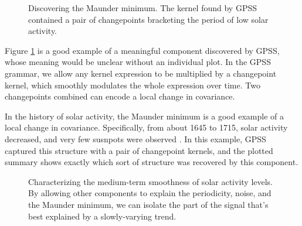 \documentclass{article} %
\begin{document}
\begin{figure}[h!]
\centering
{}
\caption{Discovering the Maunder minimum.  The kernel found by GPSS contained a pair of changepoints bracketing the period of low solar activity.}
\label{fig:maunder}
\end{figure}

Figure \ref{fig:maunder} is a good example of a meaningful component discovered by GPSS, whose meaning would be unclear without an individual plot.  In the GPSS grammar, we allow any kernel expression to be multiplied by a changepoint kernel, which smoothly modulates the whole expression over time.  Two changepoints combined can encode a local change in covariance.

In the history of solar activity, the Maunder minimum is a good example of a local change in covariance.  Specifically, from about 1645 to 1715, solar activity decreased, and very few susnpots were observed \citep{lean1995reconstruction}.  In this example, GPSS captured this structure with a pair of changepoint kernels, and the plotted summary shows exactly which sort of structure was recovered by this component.

\begin{figure}[h!]
\centering
{}
\caption{Characterizing the medium-term smoothness of solar activity levels.  By allowing other components to explain the periodicity, noise, and the Maunder minimum, we can isolate the part of the signal that's best explained by a slowly-varying trend.}
\label{fig:smooth}
\end{figure}
\end{document}
